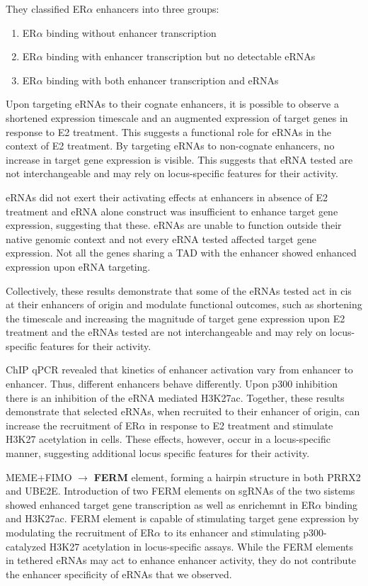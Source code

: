 They classified ER$\alpha$ enhancers into three groups:
\begin{enumerate}
\tightlist
\item ER$\alpha$ binding without enhancer transcription
\item ER$\alpha$ binding with enhancer transcription but
no detectable eRNAs
\item ER$\alpha$ binding with both enhancer transcription
and eRNAs
\end{enumerate}

Upon targeting eRNAs to their cognate
enhancers, it is possible to observe a
shortened expression timescale and an
augmented expression of target genes in
response to E2 treatment.
This suggests a functional role for eRNAs in the context of E2 treatment.
By targeting eRNAs to non-cognate enhancers, no
increase in target gene expression is visible.
This suggests that eRNA tested are not
interchangeable and may rely on locus-specific features for their activity.

eRNAs did not exert their activating effects at enhancers in absence of E2 treatment and eRNA alone construct was insufficient to enhance target gene expression, suggesting that these.
eRNAs are unable to function outside their native genomic context and not every eRNA tested affected target gene expression.
Not all the genes sharing a TAD with the enhancer showed enhanced expression upon eRNA
targeting.

Collectively, these results demonstrate that some of the eRNAs tested act in cis at their enhancers of origin and
modulate functional outcomes, such as shortening the timescale
and increasing the magnitude of target gene expression upon E2
treatment and the eRNAs tested are not interchangeable and may rely on locus-
specific features for their activity.

ChIP qPCR revealed that kinetics of enhancer
activation vary from enhancer to
enhancer. Thus, different enhancers
behave differently. Upon p300 inhibition there is an inhibition of the eRNA mediated H3K27ac.
Together, these results demonstrate that selected eRNAs, when
recruited to their enhancer of origin, can increase the recruitment of
ER$\alpha$ in response to E2 treatment and stimulate H3K27 acetylation in
cells. These effects, however, occur in a locus-specific manner,
suggesting additional locus specific features for their activity.

MEME+FIMO  $\rightarrow$  \textbf{FERM} element, forming a hairpin structure in both PRRX2 and UBE2E. Introduction of two FERM elements on
sgRNAs of the two sistems showed enhanced target gene transcription as well as enrichemnt in ER$\alpha$ binding and H3K27ac.
FERM element is capable of stimulating target gene expression by
modulating the recruitment of ER$\alpha$ to its enhancer and stimulating
p300- catalyzed H3K27 acetylation in locus-specific assays.
While the FERM elements in tethered eRNAs may act to enhance
enhancer activity, they do not contribute the enhancer specificity of
eRNAs that we observed.

